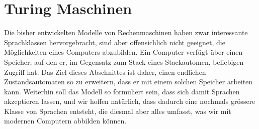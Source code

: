 %
%
%
\chapter{Turing Maschinen\label{chapter-turing}}
Die bisher entwickelten Modelle von Rechenmaschinen haben zwar
interessante Sprachklassen hervorgebracht, sind aber offensichlich nicht
geeignet, die Möglichkeiten eines Computers abzubilden.
Ein Computer verfügt über einen Speicher, auf den er, im Gegensatz zum
Stack eines Stackautomen, beliebigen Zugriff hat.
Das Ziel dieses
Abschnittes ist daher, einen endlichen Zustandsautomaten so zu
erweitern, dass er mit einem solchen Speicher arbeiten kann.
Weiterhin soll das Modell so formuliert sein, dass sich damit
Sprachen akzeptieren lassen, und wir hoffen natürlich, dass dadurch
eine nochmals grössere Klasse von Sprachen entsteht, die diesmal
aber alles umfasst, was wir mit modernen Computern abbilden können.






